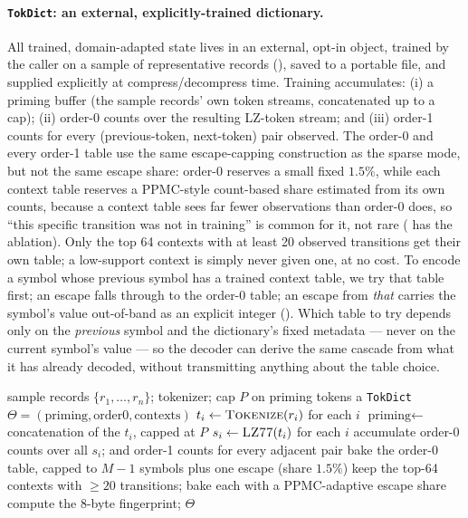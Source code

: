 \documentclass[10pt,twocolumn]{article}
\theoremstyle{plain}
\theoremstyle{definition}
\begin{document}
\paragraph{\texttt{TokDict}: an external, explicitly-trained dictionary.}
\label{par:tokdict}
All trained, domain-adapted state lives in an external, opt-in object, trained by the
caller on a sample of representative records (), saved to a
portable file, and supplied explicitly at compress/decompress time. Training
accumulates: (i) a priming buffer (the sample records' own token streams,
concatenated up to a cap); (ii) order-0 counts over the resulting LZ-token stream;
and (iii) order-1 counts for every (previous-token, next-token) pair observed. The
order-0 and every order-1 table use the same escape-capping construction as the
sparse mode, but not the same escape share: order-0 reserves a small fixed $1.5\%$,
while each context table reserves a PPMC-style count-based share estimated from its
own counts, because a context table sees far
fewer observations than order-0 does, so ``this specific transition was not in
training'' is common for it, not rare ( has the ablation). Only the
top 64 contexts with at least 20 observed transitions get their own table; a
low-support context is simply never given one, at no cost. To encode a symbol whose
previous symbol has a trained context table, we try that table first; an escape
falls through to the order-0 table; an escape from \emph{that} carries the symbol's
value out-of-band as an explicit integer (). Which table to
try depends only on the \emph{previous} symbol and the dictionary's fixed metadata
--- never on the current symbol's value --- so the decoder can derive the same
cascade from what it has already decoded, without transmitting anything about the
table choice.

\begin{algorithm}[t]
\caption{\texttt{TokDict} training}
\label{alg:tokdict-train}
\begin{algorithmic}[1]
\Require sample records $\{r_1, \dots, r_n\}$; tokenizer; cap $P$ on priming tokens
\Ensure a \texttt{TokDict} $\Theta = (\text{priming}, \text{order0}, \text{contexts})$
\State $t_i \gets \Call{Tokenize}{r_i}$ for each $i$
\State $\text{priming} \gets$ concatenation of the $t_i$, capped at $P$
\State $s_i \gets \Call{LZ77}{t_i}$ for each $i$
\State accumulate order-0 counts over all $s_i$; and order-1 counts for every adjacent pair
\State bake the order-0 table, capped to $M{-}1$ symbols plus one escape (share $1.5\%$)
\State keep the top-64 contexts with $\ge 20$ transitions; bake each with a PPMC-adaptive escape share
\State compute the 8-byte fingerprint; \Return $\Theta$
\end{algorithmic}
\end{algorithm}
\end{document}
